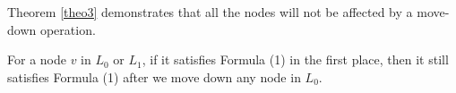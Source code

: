 
Theorem \ref{theo3} demonstrates that all the nodes will not be affected by a move-down operation.
\begin{theorem} \label{theo3}
	For a node $v$ in $L_0$ or $L_1$, if it satisfies Formula (1) in the first place, then it still satisfies Formula (1) after we move down any node in $L_0$.
\end{theorem}

